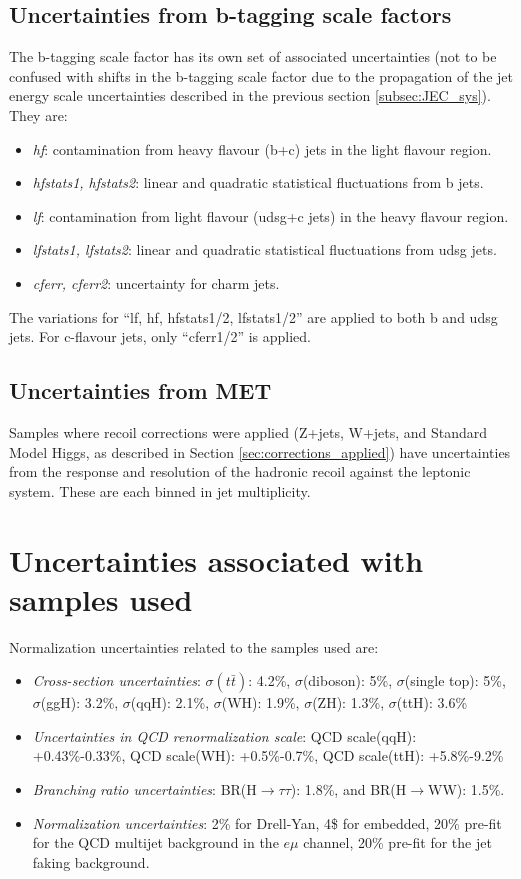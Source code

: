 \subsection{Uncertainties from b-tagging scale factors}
The b-tagging scale factor has its own set of associated uncertainties (not to be confused with shifts in the b-tagging scale factor due to the propagation of the jet energy scale uncertainties described in the previous section \ref{subsec:JEC_sys}). They are:
\begin{itemize}
    \item \textit{hf}: contamination from heavy flavour (b+c) jets in the light flavour region.
    \item \textit{hfstats1, hfstats2}: linear and quadratic statistical fluctuations from b jets. 
    \item \textit{lf}: contamination from light flavour (udsg+c jets) in the heavy flavour region.
    \item \textit{lfstats1, lfstats2}: linear and quadratic statistical fluctuations from udsg jets.
    \item \textit{cferr, cferr2}: uncertainty for charm jets.
\end{itemize}
The variations for ``lf, hf, hfstats1/2, lfstats1/2'' are applied to both b and udsg jets. For c-flavour jets, only ``cferr1/2'' is applied.

\subsection{Uncertainties from MET}
Samples where recoil corrections were applied (Z+jets, W+jets, and Standard Model Higgs, as described in Section \ref{sec:corrections_applied}) have uncertainties from the response and resolution of the hadronic recoil against the leptonic system. These are each binned in jet multiplicity.

\section{Uncertainties associated with samples used}
Normalization uncertainties related to the samples used are:
\begin{itemize}
    \item \textit{Cross-section uncertainties}: $\sigma(t\bar{t})$: 4.2\%, $\sigma$(diboson): 5\%,  $\sigma$(single top): 5\%, $\sigma$(ggH): 3.2\%, $\sigma$(qqH): 2.1\%, $\sigma$(WH): 1.9\%, $\sigma$(ZH): 1.3\%, $\sigma$(ttH): 3.6\%
    \item \textit{Uncertainties in QCD renormalization scale}: QCD scale(qqH): +0.43\%-0.33\%, QCD scale(WH): +0.5\%-0.7\%, QCD scale(ttH): +5.8\%-9.2\%
    \item \textit{Branching ratio uncertainties}: BR(H$\rightarrow\tau\tau$): 1.8\%, and BR(H$\rightarrow$WW): 1.5\%.
    \item \textit{Normalization uncertainties}: 2\% for Drell-Yan, 4\$ for embedded, 20\% pre-fit for the QCD multijet background in the $e\mu$ channel, 20\% pre-fit for the jet faking background.
\end{itemize}

